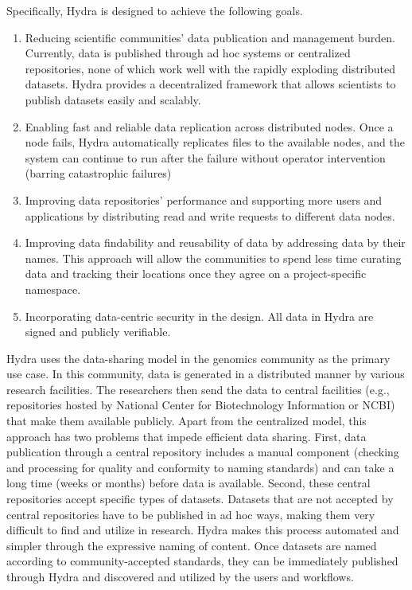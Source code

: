 Specifically, Hydra is designed to achieve the following goals.
\begin{enumerate}
\item Reducing scientific communities' data publication and management burden. Currently, data is published through ad hoc systems or centralized repositories, none of which work well with the rapidly exploding distributed datasets. Hydra provides a decentralized framework that allows scientists to publish datasets easily and scalably.
\item Enabling fast and reliable data replication across distributed nodes. Once a node fails, Hydra automatically replicates files to the available nodes, and the system can continue to run after the failure without operator intervention (barring catastrophic failures) 
\item Improving data repositories' performance and supporting more users and applications by distributing read and write requests to different data nodes.
\item Improving data findability and reusability of data by addressing data by their names. This approach will allow the communities to spend less time curating data and tracking their locations once they agree on a project-specific namespace. 
\item Incorporating data-centric security in the design. All data in Hydra are signed and publicly verifiable.
\end{enumerate}

Hydra uses the data-sharing model in the genomics community as the primary use case. In this community, data is generated in a distributed manner by various research facilities. The researchers then send the data to central facilities (e.g., repositories hosted by National Center for Biotechnology Information or NCBI) that make them available publicly. Apart from the centralized model, this approach has two problems that impede efficient data sharing. First, data publication through a central repository includes a manual component (checking and processing for quality and conformity to naming standards) and can take a long time (weeks or months) before data is available. Second, these central repositories accept specific types of datasets. Datasets that are not accepted by central repositories have to be published in ad hoc ways, making them very difficult to find and utilize in research. Hydra makes this process automated and simpler through the expressive naming of content. Once datasets are named according to community-accepted standards, they can be immediately published through Hydra and discovered and utilized by the users and workflows.

